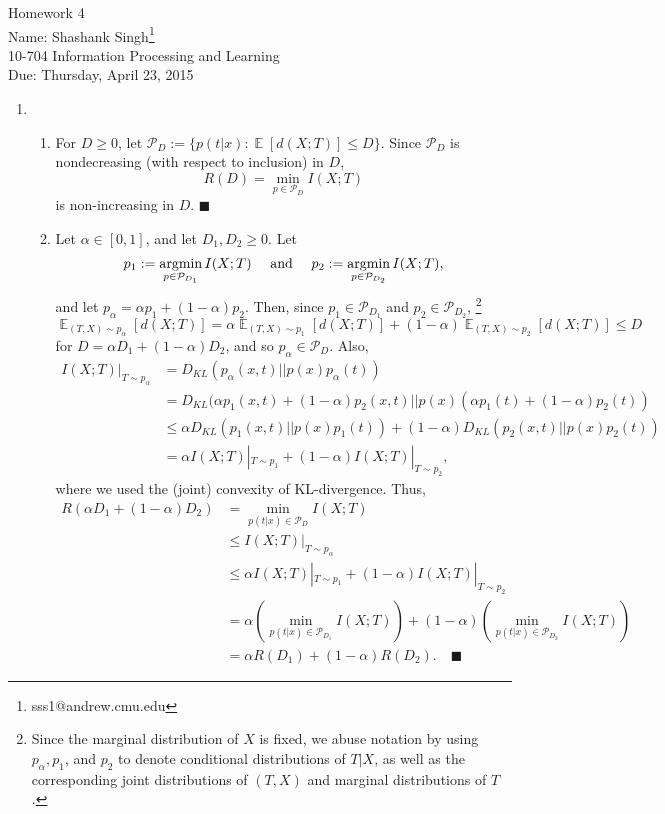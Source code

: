 \documentclass[11pt]{article}
\makeatletter
\newcommand{\myname}{Shashank Singh\footnote{sss1@andrew.cmu.edu}}
\newcommand{\myclass}{10-704 Information Processing and Learning}
\newcommand{\myhwnum}{4}
\newcommand{\duedate}{Thursday, April 23, 2015}
\renewcommand{\qed}{\quad \ensuremath{\blacksquare}}
\newcommand{\E}{\mathop{\mathbb{E}}} %
\newcommand{\Pds}{\mathcal{P}}
\newcommand{\argmin}{\operatornamewithlimits{argmin}}
\makeatother
\begin{document}
\thispagestyle{plain}

{\Large Homework \myhwnum} \\
Name: \myname \\
\myclass \\
Due: \duedate

\begin{enumerate}
\item
\begin{enumerate}
\item For $D \geq 0$, let $\Pds_D := \{p(t|x) : \E[d(X;T)] \leq D\}$.
Since $\Pds_D$ is nondecreasing (with respect to inclusion) in $D$,
\[R(D) = \min_{p \in \Pds_D} I(X;T)\]
is non-increasing in $D$. \qed

\item Let $\alpha \in [0,1]$, and let $D_1,D_2 \geq 0$. Let
\[p_1 := \argmin_{p \in \Pds_{D_1}} I(X;T)
    \quad \mbox{ and } \quad
    p_2 := \argmin_{p \in \Pds_{D_2}} I(X;T),\]
and let $p_\alpha = \alpha p_1 + (1 - \alpha) p_2$. Then, since
$p_1 \in \Pds_{D_1}$ and $p_2 \in \Pds_{D_2}$,
\footnote{Since the marginal distribution of $X$ is fixed, we abuse notation
by using $p_\alpha,p_1$, and $p_2$ to denote conditional distributions of
$T |X $, as well as the corresponding joint distributions of $(T,X)$ and
marginal distributions of $T$.}
\[\E_{(T,X) \sim p_\alpha}\left[ d(X;T) \right]
    = \alpha \E_{(T,X) \sim p_1}\left[ d(X;T) \right]
    + (1 - \alpha) \E_{(T,X) \sim p_2}\left[ d(X;T) \right]
    \leq D\]
for $D = \alpha D_1 + (1 - \alpha) D_2$, and so $p_\alpha \in \Pds_D$. Also,
\begin{align*}
I(X;T)|_{T \sim p_\alpha}
 &  = D_{KL}(p_\alpha(x,t) || p(x)p_\alpha(t))  \\
 &  = D_{KL}(\alpha p_1(x,t) + (1 - \alpha) p_2(x,t)
                            || p(x)(\alpha p_1(t) + (1 - \alpha) p_2(t))    \\
 &  \leq \alpha D_{KL}(p_1(x,t) || p(x)p_1(t))
                            + (1 - \alpha) D_{KL}(p_2(x,t) || p(x)p_2(t))   \\
 &  = \alpha I(X;T)|_{T \sim p_1} + (1 - \alpha) I(X;T)|_{T \sim p_2},
\end{align*}
where we used the (joint) convexity of KL-divergence. Thus,
\begin{align*}
R(\alpha D_1 + (1 - \alpha) D_2)
 &  = \min_{p(t|x) \in \Pds_D} I(X;T) \\
 &  \leq I(X;T) |_{T \sim p_\alpha}     \\
 &  \leq \alpha I(X;T) |_{T \sim p_1} + (1 - \alpha) I(X;T) |_{T \sim p_2}  \\
 &  = \alpha \left( \min_{p(t|x) \in \Pds_{D_1}} I(X;T) \right)
    + (1 - \alpha) \left( \min_{p(t|x) \in \Pds_{D_2}} I(X;T) \right)   \\
 &  = \alpha R(D_1) + (1 - \alpha) R(D_2). \qed
\end{align*}


\end{enumerate}
\end{enumerate}
\end{document}
